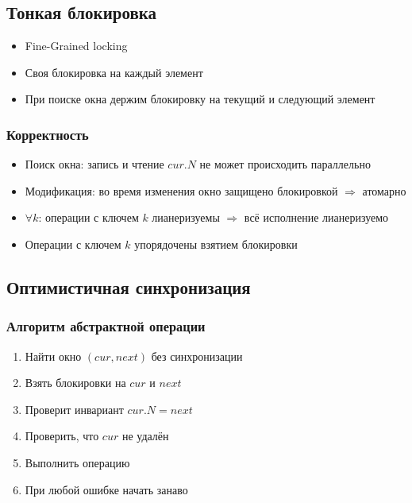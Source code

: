 \documentclass[10pt,a4paper,oneside,titlepage]{article}
\theoremstyle{plain}
\theoremstyle{defenition}
\begin{document}
\subsection{Тонкая блокировка}

\begin{itemize}
	\item Fine-Grained locking
	\item Своя блокировка на каждый элемент
	\item При поиске окна держим блокировку на текущий и следующий элемент
\end{itemize}

\subsubsection{Корректность}

\begin{itemize}
	\item Поиск окна: запись и чтение $cur.N$ не может происходить параллельно
	\item Модификация: во время изменения окно защищено блокировкой $\Rightarrow$ атомарно
	\item $\forall k$: операции с ключем $k$ лианеризуемы $\Rightarrow$ всё исполнение лианеризуемо
	\item Операции с ключем $k$ упорядочены взятием блокировки
\end{itemize}

\subsection{Оптимистичная синхронизация}

\subsubsection{Алгоритм абстрактной операции}

\begin{enumerate}
	\item Найти окно $(cur, next)$ без синхронизации
	\item Взять блокировки на $cur$ и $next$
	\item Проверит инвариант $cur.N=next$
	\item Проверить, что $cur$ не удалён
	\item Выполнить операцию
	\item При любой ошибке начать занаво
\end{enumerate}
\end{document}
